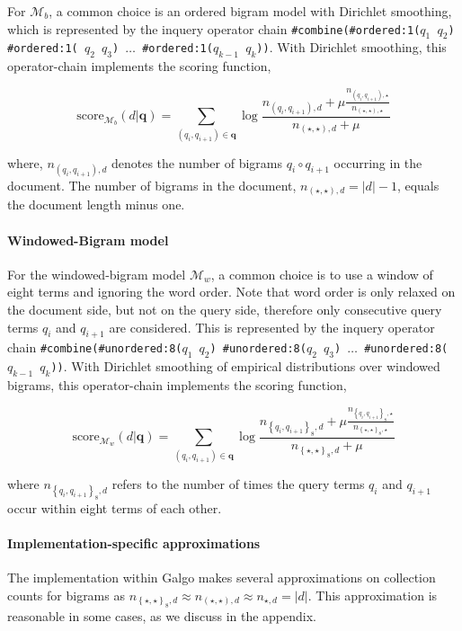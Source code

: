 \documentclass[]{article}
\begin{document}
For $\mathcal{M}_{b}$, a common choice is an ordered bigram model
with Dirichlet smoothing, which is represented by the inquery operator
chain \texttt{\#combine(\#ordered:1($q_{1}$ $q_{2}$) \#ordered:1( $q_{2}$
$q_{3}$) $\ldots$ \#ordered:1($q_{k-1}$ $q_{k}$))}. With Dirichlet
smoothing, this operator-chain implements the scoring function,

\[
\mbox{score}_{\mathcal{M}_{b}}(d|\mathbf{q})=\sum_{\left(q_{i},q_{i+1}\right)\in\mathbf{q}}\log\frac{n_{\left(q_{i},q_{i+1}\right),d}+\mu\frac{n_{\left(q_{i},q_{i+1}\right),\star}}{n_{\left(\star,\star\right),\star}}}{n_{\left(\star,\star\right),d}+\mu}
\]

where, $n_{\left(q_{i},q_{i+1}\right),d}$ denotes the number of bigrams $q_{i} \circ q_{i+1}$
occurring in the document. The number of bigrams in the document,
$n_{\left(\star,\star\right),d}=|d|-1$, equals the document length
minus one.

\paragraph*{Windowed-Bigram model}

For the windowed\nobreakdash-bigram model $\mathcal{M}_{w}$, a common choice
is to use a window of eight terms and ignoring the word order. Note
that word order is only relaxed on the document side, but not on the
query side, therefore only consecutive query terms $q_{i}$ and $q_{i+1}$
are considered. This is represented by the inquery operator chain
\texttt{\#combine(\#unordered:8($q_{1}$ $q_{2}$) \#unordered:8($q_{2}$
$q_{3}$) \textcompwordmark{} $\ldots$ \#unordered:8($q_{k-1}$
$q_{k}$))}. With Dirichlet smoothing of empirical distributions over
windowed bigrams, this operator-chain implements the scoring function,

\[
\mbox{score}_{\mathcal{M}_{w}}(d|\mathbf{q})=\sum_{\left(q_{i},q_{i+1}\right)\in\mathbf{q}}\log\frac{n_{\left\{ q_{i},q_{i+1}\right\} _{8},d}+\mu\frac{n_{\left\{ q_{i},q_{i+1}\right\} _{8},\star}}{n_{\left\{ \star,\star\right\} _{8},\star}}}{n_{\left\{ \star,\star\right\} _{8},d}+\mu}
\]

where $n_{\left\{ q_{i},q_{i+1}\right\} _{8},d}$ refers to the number
of times the query terms $q_{i}$ and $q_{i+1}$ occur within eight
terms of each other. 

\paragraph*{Implementation-specific approximations}
The implementation within Galgo makes several approximations on collection counts for bigrams as $n_{\left\{ \star,\star\right\} _{8},d} \approx n_{\left(\star,\star\right),d} \approx n_{\star,d}=|d|$. This approximation is reasonable in some cases, as we discuss in the appendix.
\end{document}
